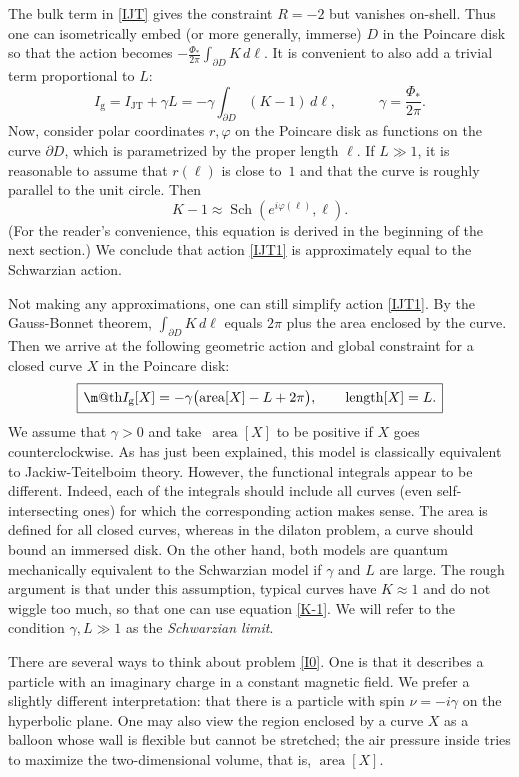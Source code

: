 \documentclass[12pt]{article}
\makeatletter
\newcommand*{\wideboxed}[1]{\setlength{\fboxsep}{1ex}%
  \fbox{\m@th$\displaystyle#1$}}
\newcommand{\vp}{\varphi}
\DeclareMathOperator{\Sch}{Sch}
\DeclareMathOperator{\area}{area}
\DeclareMathOperator{\len}{length}
\newcommand{\g}{\text{g}}
\makeatother
\begin{document}
The bulk term in \eqref{IJT} gives the constraint $R=-2$ but vanishes on-shell. Thus one can isometrically embed (or more generally, immerse) $D$ in the Poincare disk so that the action becomes $-\frac{\Phi_*}{2\pi}\int_{\partial D}K\,d\ell$. It is convenient to also add a trivial term proportional to $L$:
\begin{equation}\label{IJT1}
I_{\g}=I_{\text{JT}}+\gamma L=-\gamma\int_{\partial D}(K-1)\,d\ell,\qquad\quad
\gamma=\frac{\Phi_*}{2\pi}.
\end{equation}
Now, consider polar coordinates $r,\vp$ on the Poincare disk as functions on the curve $\partial D$, which is parametrized by the proper length $\ell$. If $L\gg 1$, it is reasonable to assume that $r(\ell)$ is close to~$1$ and that the curve is roughly parallel to the unit circle. Then
\begin{equation}\label{K-1}
K-1 \approx\Sch(e^{i\vp(\ell)},\ell).
\end{equation}
(For the reader's convenience, this equation is derived in the beginning of the next section.) We conclude that action \eqref{IJT1} is approximately equal to the Schwarzian action.

Not making any approximations, one can still simplify action \eqref{IJT1}. By the Gauss-Bonnet theorem, $\int_{\partial D}K\,d\ell$ equals $2\pi$ plus the area enclosed by the curve. Then we arrive at the following geometric action and global constraint for a closed curve $X$ in the Poincare disk:
\begin{equation}\label{I0}
\wideboxed{
I_{\g}[X]=-\gamma\bigl(\area[X]-L+2\pi\bigr),\qquad \len[X]=L.
}
\end{equation}
We assume that $\gamma>0$ and take $\,\area[X]$ to be positive if $X$ goes counterclockwise. As has just been explained, this model is classically equivalent to Jackiw-Teitelboim theory. However, the functional integrals appear to be different. Indeed, each of the integrals should include all curves (even self-intersecting ones) for which the corresponding action makes sense. The area is defined for all closed curves, whereas in the dilaton problem, a curve should bound an immersed disk. On the other hand, both models are quantum mechanically equivalent to the Schwarzian model if $\gamma$ and $L$ are large. The rough argument is that under this assumption, typical curves have $K\approx 1$ and do not wiggle too much, so that one can use equation \eqref{K-1}. We will refer to the condition $\gamma,L\gg 1$ as the \emph{Schwarzian limit}.

There are several ways to think about problem \eqref{I0}. One is that it describes a particle with an imaginary charge in a constant magnetic field. We prefer a slightly different interpretation: that there is a particle with spin $\nu=-i\gamma$ on the hyperbolic plane. One may also view the region enclosed by a curve $X$ as a balloon whose wall is flexible but cannot be stretched; the air pressure inside tries to maximize the two-dimensional volume, that is, $\area[X]$. 
\end{document}
